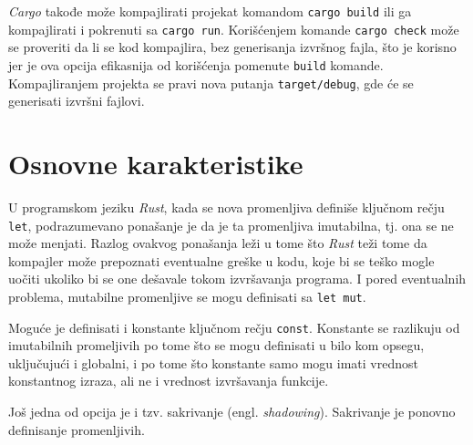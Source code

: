 \documentclass[12pt,oneside]{memoir}
\begin{document}


\emph{Cargo} takođe može kompajlirati projekat komandom 
\texttt{cargo build} ili ga kompajlirati i pokrenuti sa 
\texttt{cargo run}. Korišćenjem komande \texttt{cargo check} 
može se proveriti da li se kod kompajlira, bez generisanja 
izvršnog fajla, što je korisno jer je ova opcija efikasnija 
od korišćenja pomenute \texttt{build} komande. Kompajliranjem 
projekta se pravi nova putanja \texttt{target/debug}, gde će se 
generisati izvršni fajlovi.

\section{Osnovne karakteristike}
U programskom jeziku \emph{Rust}, kada se nova promenljiva definiše 
ključnom rečju \texttt{let}, podrazumevano ponašanje je da je ta 
promenljiva imutabilna, tj. ona se ne može menjati. Razlog ovakvog 
ponašanja leži u tome što \emph{Rust} teži tome da kompajler može 
prepoznati eventualne greške u kodu, koje bi se teško mogle uočiti 
ukoliko bi se one dešavale tokom izvršavanja programa. I pored 
eventualnih problema, mutabilne promenljive se mogu definisati 
sa \texttt{let mut}.

Moguće je definisati i konstante ključnom rečju \texttt{const}. 
Konstante se razlikuju od imutabilnih promeljivih po tome što se 
mogu definisati u bilo kom opsegu, uključujući i globalni, i po 
tome što konstante samo mogu imati vrednost konstantnog izraza, 
ali ne i vrednost izvršavanja funkcije.

Još jedna od opcija je i tzv. sakrivanje (engl. \emph{shadowing}). 
Sakrivanje je ponovno definisanje promenljivih.

\end{document}

